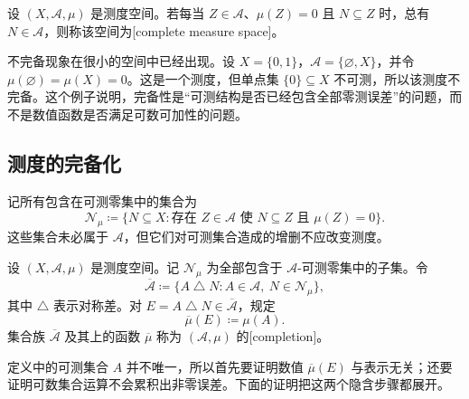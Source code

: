 \begin{definition}
\label{b1:def:complete-measure}
设 \((X,\mathcal A,\mu)\) 是测度空间。若每当 \(Z\in\mathcal A\)、\(\mu(Z)=0\) 且 \(N\subseteq Z\) 时，总有 \(N\in\mathcal A\)，则称该空间为[complete measure space]。
\end{definition}

不完备现象在很小的空间中已经出现。设 \(X=\{0,1\}\)，\(\mathcal A=\{\varnothing,X\}\)，并令 \(\mu(\varnothing)=\mu(X)=0\)。这是一个测度，但单点集 \(\{0\}\subseteq X\) 不可测，所以该测度不完备。这个例子说明，完备性是“可测结构是否已经包含全部零测误差”的问题，而不是数值函数是否满足可数可加性的问题。

\subsection{测度的完备化}
\label{b1:subsec:020204}

记所有包含在可测零集中的集合为
\[
\mathcal N_\mu
\coloneqq\{N\subseteq X:\text{存在 }Z\in\mathcal A\text{ 使 }N\subseteq Z\text{ 且 }\mu(Z)=0\}.
\]
这些集合未必属于 \(\mathcal A\)，但它们对可测集合造成的增删不应改变测度。

\begin{definition}
\label{b1:def:completion}
设 \((X,\mathcal A,\mu)\) 是测度空间。记 \(\mathcal N_\mu\) 为全部包含于 \(\mathcal A\)-可测零集中的子集。令
\[
\overline{\mathcal A}
\coloneqq\{A\mathbin{\triangle}N:A\in\mathcal A,\ N\in\mathcal N_\mu\},
\]
其中 \(\triangle\) 表示对称差。对 \(E=A\mathbin{\triangle}N\in\overline{\mathcal A}\)，规定
\[
\overline\mu(E)\coloneqq\mu(A).
\]
集合族 \(\overline{\mathcal A}\) 及其上的函数 \(\overline\mu\) 称为 \((\mathcal A,\mu)\) 的[completion]。
\end{definition}

定义中的可测集合 \(A\) 并不唯一，所以首先要证明数值 \(\overline\mu(E)\) 与表示无关；还要证明可数集合运算不会累积出非零误差。下面的证明把这两个隐含步骤都展开。

